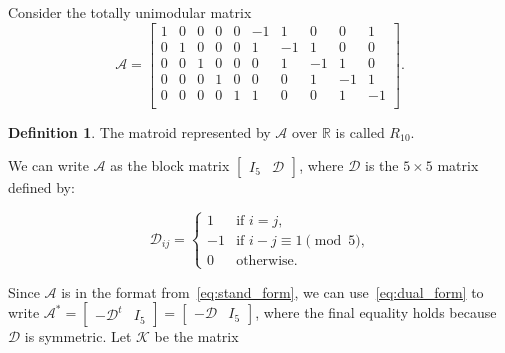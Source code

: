 \documentclass[12p]{amsart}
\numberwithin{equation}{section}
\theoremstyle{plain}
\theoremstyle{definition}
\newtheorem{defn}[thm]{Definition}
\begin{document}
Consider the totally unimodular matrix
\begin{equation}\label{eq:R10}\mathcal A = \begin{bmatrix}
    1 & 0 & 0 & 0 & 0 &   -1 & 1 & 0 & 0 & 1\\
    0 & 1 & 0 & 0 & 0 &   1 & -1 & 1 & 0 & 0\\
    0 & 0 & 1 & 0 & 0 &   0 & 1 & -1 & 1 & 0\\
    0 & 0 & 0 & 1 & 0 &   0 & 0 & 1 & -1 & 1\\
    0 & 0 & 0 & 0 & 1 &   1 & 0 & 0 & 1 & -1\\
\end{bmatrix}.\end{equation}

\begin{defn}\label{def:R10}
    The matroid represented by $\mathcal A$ over $\mathbb R$ is called $R_{10}$. 
\end{defn}

We can write $\mathcal A$ as the block matrix $\begin{bmatrix} I_5 & \mathcal D \end{bmatrix}$, where $\mathcal D$ is the $5 \times 5$ matrix defined by:

\[\mathcal D_{ij} = \begin{cases} 1 & \text{if $i=j$,}\\
-1 &\text{if $i-j \equiv 1\pmod 5$,}\\
0 & \text{otherwise.}\end{cases}\]

Since $\mathcal A$ is in the format from~\eqref{eq:stand_form}, we can use~\eqref{eq:dual_form} to write $\mathcal A^* = \begin{bmatrix} -\mathcal D^t & I_5 \end{bmatrix} = \begin{bmatrix} -\mathcal D & I_5 \end{bmatrix}$, where the final equality holds because $\mathcal D$ is symmetric. Let $\mathcal K$ be the matrix 
\end{document}
